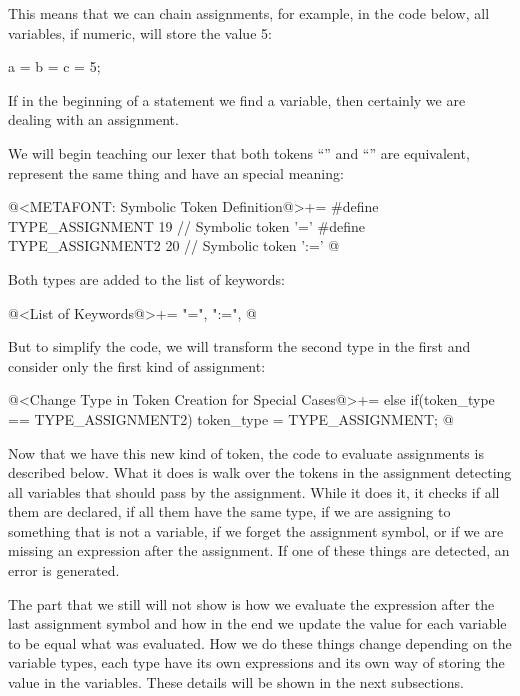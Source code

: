This means that we can chain assignments, for example, in the code
below, all variables, if numeric, will store the value 5:

\alinhaverbatim
a = b = c = 5;
\alinhanormal

If in the beginning of a statement we find a variable, then certainly
we are dealing with an assignment.

We will begin teaching our lexer that both tokens ``\monoespaco{=}''
and ``\monoespaco{:=}'' are equivalent, represent the same thing and
have an special meaning:

\iniciocodigo
@<METAFONT: Symbolic Token Definition@>+=
#define TYPE_ASSIGNMENT            19 // Symbolic token '='
#define TYPE_ASSIGNMENT2           20 // Symbolic token ':='
@
\fimcodigo

Both types are added to the list of keywords:

\iniciocodigo
@<List of Keywords@>+=
"=", ":=",
@
\fimcodigo

But to simplify the code, we will transform the second type in the
first and consider only the first kind of assignment:

\iniciocodigo
@<Change Type in Token Creation for Special Cases@>+=
else if(token_type == TYPE_ASSIGNMENT2)
  token_type = TYPE_ASSIGNMENT;
@
\fimcodigo


Now that we have this new kind of token, the code to evaluate
assignments is described below. What it does is walk over the tokens
in the assignment detecting all variables that should pass by the
assignment. While it does it, it checks if all them are declared, if
all them have the same type, if we are assigning to something that is
not a variable, if we forget the assignment symbol, or if we are
missing an expression after the assignment. If one of these things are
detected, an error is generated.

The part that we still will not show is how we evaluate the expression
after the last assignment symbol and how in the end we update the
value for each variable to be equal what was evaluated. How we do
these things change depending on the variable types, each type have
its own expressions and its own way of storing the value in the
variables. These details will be shown in the next subsections.

